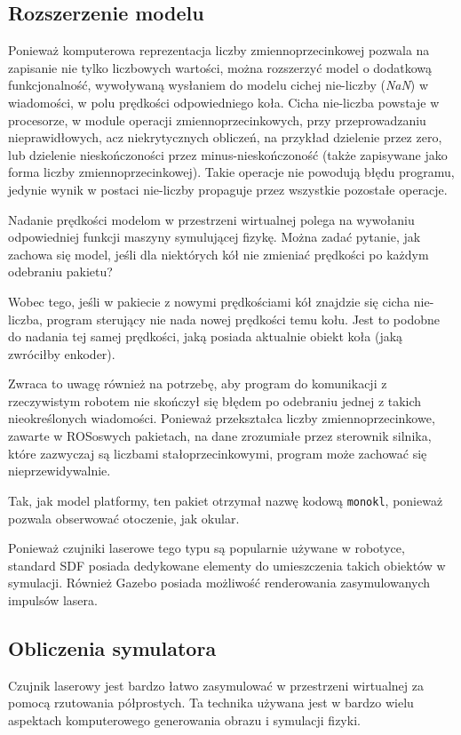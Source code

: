 	\subsection{Rozszerzenie modelu}
		\label{sec:model_nan}
		Ponieważ komputerowa reprezentacja liczby zmiennoprzecinkowej pozwala na zapisanie nie tylko liczbowych wartości, można rozszerzyć model o dodatkową funkcjonalność,
		wywoływaną wysłaniem do modelu cichej nie-liczby (\emph{NaN}) w wiadomości, w polu prędkości odpowiedniego koła. 
		Cicha nie-liczba powstaje w procesorze, w module operacji zmiennoprzecinkowych, przy przeprowadzaniu nieprawidłowych, 
		acz niekrytycznych obliczeń, na przykład dzielenie przez zero, lub dzielenie nieskończoności przez minus-nieskończoność 
		(także zapisywane jako forma liczby zmiennoprzecinkowej).
		Takie operacje nie powodują błędu programu, jedynie wynik w postaci nie-liczby propaguje przez wszystkie pozostałe operacje.

		Nadanie prędkości modelom w przestrzeni wirtualnej polega na wywołaniu odpowiedniej funkcji maszyny symulującej fizykę.
		Można zadać pytanie, jak zachowa się model, jeśli dla niektórych kół nie zmieniać prędkości po każdym odebraniu pakietu?

		Wobec tego, jeśli w pakiecie z nowymi prędkościami kół znajdzie się cicha nie-liczba, program sterujący nie nada nowej prędkości temu kołu.
		Jest to podobne do nadania tej samej prędkości, jaką posiada aktualnie obiekt koła (jaką zwróciłby enkoder).

		Zwraca to uwagę również na potrzebę, aby program do komunikacji z rzeczywistym robotem nie skończył się błędem po odebraniu jednej z takich nieokreślonych wiadomości.
		Ponieważ przekształca liczby zmiennoprzecinkowe, zawarte w ROSoswych pakietach, na dane zrozumiałe przez sterownik silnika, które zazwyczaj są liczbami
		stałoprzecinkowymi, program może zachować się nieprzewidywalnie.
		
	Tak, jak model platformy, ten pakiet otrzymał nazwę kodową \texttt{monokl}, ponieważ pozwala obserwować otoczenie, jak okular.
	
	Ponieważ czujniki laserowe tego typu są popularnie używane w robotyce, standard SDF posiada dedykowane elementy do umieszczenia takich obiektów w symulacji.
	Również Gazebo posiada możliwość renderowania zasymulowanych impulsów lasera.
	
	\subsection{Obliczenia symulatora}
		Czujnik laserowy jest bardzo łatwo zasymulować w przestrzeni wirtualnej za pomocą rzutowania półprostych.
		Ta technika używana jest w bardzo wielu aspektach komputerowego generowania obrazu i symulacji fizyki.

